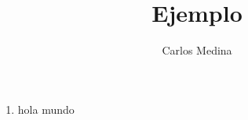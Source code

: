 \documentclass[spanish,10pt,a4paper]{article}
\title{Ejemplo}
\author{Carlos Medina}
\begin{document}
	\maketitle
	
\begin{enumerate}
	\item hola mundo
\end{enumerate}
\end{document}
